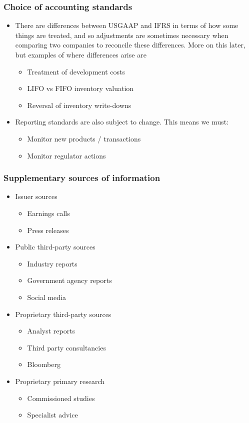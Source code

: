 \documentclass[../notes_compiled.tex]{subfiles}
\begin{document}
\subsubsection{Choice of accounting standards}
\begin{itemize}
\item There are differences between USGAAP and IFRS in terms of how some things are treated, and so adjustments are sometimes necessary when comparing two companies to reconcile these differences. More on this later, but examples of where differences arise are
\begin{itemize}
\item Treatment of development costs
\item LIFO vs FIFO inventory valuation
\item Reversal of inventory write-downs
\end{itemize}
\item Reporting standards are also subject to change. This means we must:
\begin{itemize}
\item Monitor new products / transactions
\item Monitor regulator actions
\end{itemize}
\end{itemize}

\subsubsection{Supplementary sources of information}
\begin{multicols}{2}
\begin{itemize}
\item Issuer sources
\begin{itemize}
\item Earnings calls
\item Press releases
\end{itemize}
\item Public third-party sources
\begin{itemize}
\item Industry reports
\item Government agency reports
\item Social media
\end{itemize}
\item Proprietary third-party sources
\begin{itemize}
\item Analyst reports
\item Third party consultancies
\item Bloomberg
\end{itemize}
\item Proprietary primary research
\begin{itemize}
\item Commissioned studies
\item Specialist advice
\end{itemize}
\end{itemize}
\end{multicols}
\end{document}
